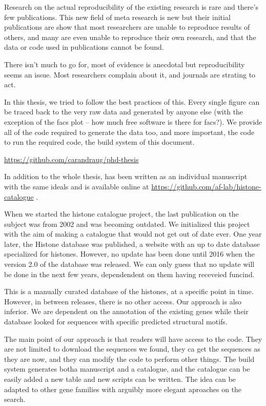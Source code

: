 
Research on the actual reproducibility of the existing research is
rare and there's few publications.  This new field of meta research is
new but their initial publications are show that most researchers are
unable to reproduce results of others, and many are even unable to
reproduce their own research, and that the data or code used in
publications cannot be found.

There isn't much to go for, most of evidence is anecdotal but
reproducibility seems an issue.  Most researchers complain about it,
and journals are strating to act.

In this thesis, we tried to follow the best practices of this.  Every
single figure can be traced back to the very raw data and generated by
anyone else (with the exception of the facs plot -- how much free
software is there for facs?).  We provide all of the code required to
generate the data too, and more important, the code to run the
required code, the build system of this document.

\url{https://github.com/carandraug/phd-thesis} 

In addition to the whole thesis,  has been
written as an individual manuscript with the same ideals and is
available online at \url{https://github.com/af-lab/histone-catalogue}
.

When we started the histone catalogue project, the last publication on
the subject was from 2002 and was becoming outdated.  We initialized
this project with the aim of making a catalogue that would not get out
of date ever.  One year later, the Histone database was published, a
website with an up to date database specialized for histones.
However, no update has been done until 2016 when the version 2.0 of
the database was released.  We can only guess that no update will be
done in the next few years, dependendent on them having receveied
funcind.

This is a manually curated database of the histones, at a specific
point in time.  However, in between releases, there is no other
access.  Our approach is also inferior.  We are dependent on the
annotation of the existing genes while their database looked for
sequences with specific predicted structural motifs.

The main point of our approach is that readers will have access to the
code.  They are not limited to download the sequences we found, they
ca get the sequences as they are now, and they can modify the code to
perform other things.  The build system generates botha manuscript and
a catalogue, and the catalogue can be easily added a new table and new
scripts can be written.  The idea can be adapted to other gene
families with arguibly more elegant aproaches on the search.

